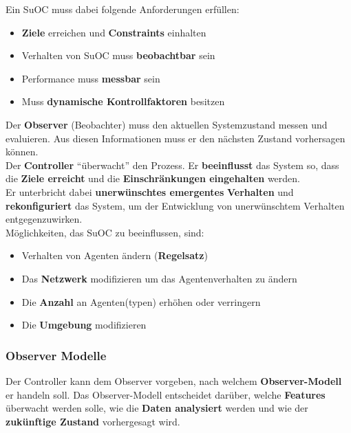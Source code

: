 \documentclass[a4paper]{article}
\begin{document}
Ein SuOC muss dabei folgende Anforderungen erfüllen:
\begin{itemize}
	\item \textbf{Ziele} erreichen und \textbf{Constraints} einhalten
	\item Verhalten von SuOC muss \textbf{beobachtbar} sein
	\item Performance muss \textbf{messbar} sein
	\item Muss \textbf{dynamische Kontrollfaktoren} besitzen
\end{itemize}

Der \textbf{Observer} (Beobachter) muss den aktuellen Systemzustand messen und evaluieren. Aus diesen Informationen muss er den nächsten Zustand vorhersagen können.\\


Der \textbf{Controller} ``überwacht'' den Prozess. Er \textbf{beeinflusst} das System so, dass die \textbf{Ziele erreicht} und die \textbf{Einschränkungen eingehalten} werden.\\
 Er unterbricht dabei \textbf{unerwünschtes emergentes} \textbf{Verhalten} und \textbf{rekonfiguriert} das System, um der Entwicklung von unerwünschtem Verhalten entgegenzuwirken. \\
 
 Möglichkeiten, das SuOC zu beeinflussen, sind:
 \begin{itemize}
 	\item Verhalten von Agenten ändern (\textbf{Regelsatz}) 
 	\item Das \textbf{Netzwerk} modifizieren um das Agentenverhalten zu ändern
 	\item Die \textbf{Anzahl} an Agenten(typen) erhöhen oder verringern
 	\item Die \textbf{Umgebung} modifizieren
 \end{itemize}
\subsubsection{Observer Modelle}
Der Controller kann dem Observer vorgeben, nach welchem \textbf{Observer-Modell} er handeln soll. Das Observer-Modell entscheidet darüber, welche \textbf{Features} überwacht werden solle, wie die \textbf{Daten analysiert} werden und wie der \textbf{zukünftige Zustand} vorhergesagt wird.
\end{document}
